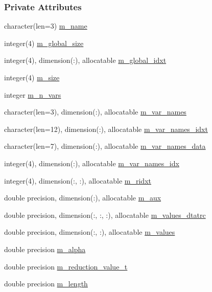 \subsubsection*{Private Attributes}
\begin{DoxyCompactItemize}
\item 
character(len=3) \mbox{\hyperlink{structsponge__mod_1_1sponge_a2772acd01b2159e7538ae075bb79d002}{m\+\_\+name}}
\item 
integer(4) \mbox{\hyperlink{structsponge__mod_1_1sponge_a013fe29d72c3bb46d15e484c75319dab}{m\+\_\+global\+\_\+size}}
\item 
integer(4), dimension(\+:), allocatable \mbox{\hyperlink{structsponge__mod_1_1sponge_ae8abf3ac8cf4f449ad890c0f892c5cfc}{m\+\_\+global\+\_\+idxt}}
\item 
integer(4) \mbox{\hyperlink{structsponge__mod_1_1sponge_aea00d9b1a185ddbedbed0fb7ee735950}{m\+\_\+size}}
\item 
integer \mbox{\hyperlink{structsponge__mod_1_1sponge_a3593de7bf7fc4415e27ef61d00a741f3}{m\+\_\+n\+\_\+vars}}
\item 
character(len=3), dimension(\+:), allocatable \mbox{\hyperlink{structsponge__mod_1_1sponge_ab1680a427e7b0bc1ffa592cd4981bef3}{m\+\_\+var\+\_\+names}}
\item 
character(len=12), dimension(\+:), allocatable \mbox{\hyperlink{structsponge__mod_1_1sponge_a6e80ea1bddd446d18272998fd99bfb0e}{m\+\_\+var\+\_\+names\+\_\+idxt}}
\item 
character(len=7), dimension(\+:), allocatable \mbox{\hyperlink{structsponge__mod_1_1sponge_a92d436c4342008e48be50f8a24763126}{m\+\_\+var\+\_\+names\+\_\+data}}
\item 
integer(4), dimension(\+:), allocatable \mbox{\hyperlink{structsponge__mod_1_1sponge_ae9500658821f8133f368d3498ae29bff}{m\+\_\+var\+\_\+names\+\_\+idx}}
\item 
integer(4), dimension(\+:, \+:), allocatable \mbox{\hyperlink{structsponge__mod_1_1sponge_a8eb04cbc3c298283d7d41b96afe68303}{m\+\_\+ridxt}}
\item 
double precision, dimension(\+:), allocatable \mbox{\hyperlink{structsponge__mod_1_1sponge_a1bb1f743a4745eb7b76d647ac7299a10}{m\+\_\+aux}}
\item 
double precision, dimension(\+:, \+:, \+:), allocatable \mbox{\hyperlink{structsponge__mod_1_1sponge_a2edf92416fc98db4d8105f6c7a7c3aaa}{m\+\_\+values\+\_\+dtatrc}}
\item 
double precision, dimension(\+:, \+:), allocatable \mbox{\hyperlink{structsponge__mod_1_1sponge_ae5b49e184aac449a582c2b35149bfafa}{m\+\_\+values}}
\item 
double precision \mbox{\hyperlink{structsponge__mod_1_1sponge_aeb3b50dcf03f861abad13b7b12697ff5}{m\+\_\+alpha}}
\item 
double precision \mbox{\hyperlink{structsponge__mod_1_1sponge_a7d79ba225284f05c08fa8126ec467c72}{m\+\_\+reduction\+\_\+value\+\_\+t}}
\item 
double precision \mbox{\hyperlink{structsponge__mod_1_1sponge_ae224137cda346dac603ed0412ccd8c2d}{m\+\_\+length}}
\end{DoxyCompactItemize}


